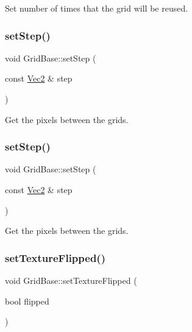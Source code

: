 Set number of times that the grid will be reused. \mbox{\label{classGridBase_a7d8d0336cded71e9a0874b4fafa4b4c7}} 
\subsubsection{\texorpdfstring{set\+Step()}{setStep()}\hspace{0.1cm}{\footnotesize\ttfamily [1/2]}}
{\footnotesize\ttfamily void Grid\+Base\+::set\+Step (\begin{DoxyParamCaption}\item[{const \hyperlink{classVec2}{Vec2} \&}]{step }\end{DoxyParamCaption})\hspace{0.3cm}{\ttfamily [inline]}}

Get the pixels between the grids. \mbox{\label{classGridBase_a7d8d0336cded71e9a0874b4fafa4b4c7}} 
\subsubsection{\texorpdfstring{set\+Step()}{setStep()}\hspace{0.1cm}{\footnotesize\ttfamily [2/2]}}
{\footnotesize\ttfamily void Grid\+Base\+::set\+Step (\begin{DoxyParamCaption}\item[{const \hyperlink{classVec2}{Vec2} \&}]{step }\end{DoxyParamCaption})\hspace{0.3cm}{\ttfamily [inline]}}

Get the pixels between the grids. \mbox{\label{classGridBase_a056aba2cf7d266d1484fa0196863d1e7}} 
\subsubsection{\texorpdfstring{set\+Texture\+Flipped()}{setTextureFlipped()}\hspace{0.1cm}{\footnotesize\ttfamily [1/2]}}
{\footnotesize\ttfamily void Grid\+Base\+::set\+Texture\+Flipped (\begin{DoxyParamCaption}\item[{bool}]{flipped }\end{DoxyParamCaption})}

